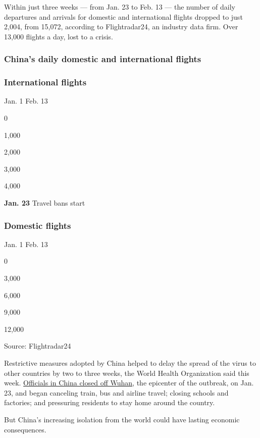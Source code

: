Within just three weeks --- from Jan. 23 to Feb. 13 --- the number of
daily departures and arrivals for domestic and international flights
dropped to just 2,004, from 15,072, according to Flightradar24, an
industry data firm. Over 13,000 flights a day, lost to a crisis.

\hypertarget{chinas-daily-domestic-and-international-flights}{%
\subsubsection{China's daily domestic and international
flights}\label{chinas-daily-domestic-and-international-flights}}

\hypertarget{international-flights}{%
\subsubsection{International flights}\label{international-flights}}

Jan. 1 Feb. 13

0

1,000

2,000

3,000

4,000

\textbf{Jan. 23} Travel bans start

\hypertarget{domestic-flights}{%
\subsubsection{Domestic flights}\label{domestic-flights}}

Jan. 1 Feb. 13

0

3,000

6,000

9,000

12,000

Source: Flightradar24

Restrictive measures adopted by China helped to delay the spread of the
virus to other countries by two to three weeks, the World Health
Organization said this week.
\href{https://www.nytimes3xbfgragh.onion/2020/02/13/world/coronavirus-timeline.html}{Officials
in China closed off Wuhan}, the epicenter of the outbreak, on Jan. 23,
and began canceling train, bus and airline travel; closing schools and
factories; and pressuring residents to stay home around the country.

But China's increasing isolation from the world could have lasting
economic consequences.

